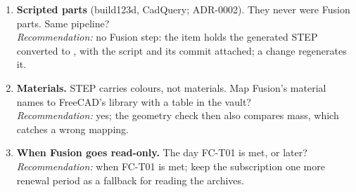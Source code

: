 \begin{enumerate}
        \emph{Recommendation:} attach the PDFs; redraw a part's drawing when the part next changes.
  \item \textbf{Scripted parts} (build123d, CadQuery; ADR-0002). They never were Fusion parts. Same pipeline?\\
        \emph{Recommendation:} no Fusion step: the item holds the generated STEP converted to , with the
        script and its commit attached; a change regenerates it.
  \item \textbf{Materials.} STEP carries colours, not materials. Map Fusion's material names to FreeCAD's library with
        a table in the vault?\\
        \emph{Recommendation:} yes; the geometry check then also compares mass, which catches a wrong mapping.
  \item \textbf{When Fusion goes read-only.} The day FC-T01 is met, or later?\\
        \emph{Recommendation:} when FC-T01 is met; keep the subscription one more renewal period as a fallback for
        reading the archives.
\end{enumerate}
